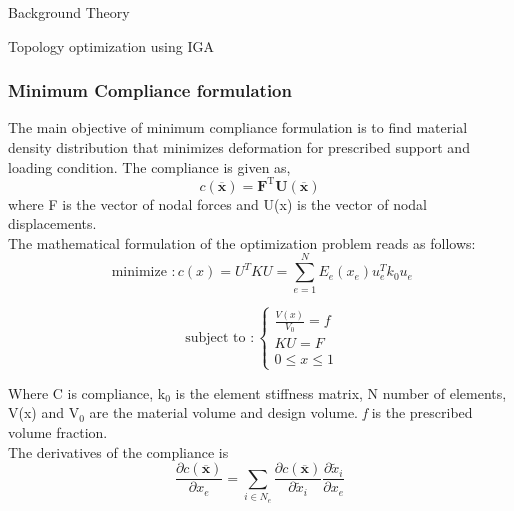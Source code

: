 \documentclass[a4paper,12pt,times]{article}
\begin{document}
\begin{section}{Background Theory}
\begin{subsection}{Topology optimization using IGA}
\subsubsection{Minimum Compliance formulation}

The main objective of minimum compliance formulation is to find material density distribution that minimizes deformation for prescribed support and loading condition.
The compliance is given as,
\begin{equation}
c(\overline{\mathbf{x}})=\mathbf{F}^{\mathrm{T}} \mathbf{U}(\overline{\mathbf{x}})
\end{equation}
where F is the vector of nodal forces and U(x) is the vector
of nodal displacements.\\
The mathematical formulation of the optimization problem reads as follows:
\begin{equation}
\text { minimize }: c(x)=U^{T} K U=\sum_{e=1}^{N} E_{e}\left(x_{e}\right) u_{e}^{T} k_{0} u_{e}
\end{equation}

\begin{equation}
\text { subject to }:\left\{\begin{array}{l}
\frac{V(x)}{V_{0}}=f \\
K U=F \\
0 \leq x \leq 1
\end{array}\right.
\end{equation}

Where C is compliance, k$_0$ is the element stiffness matrix, N number of elements, V(x) and V$_0$ are the material volume and design volume. \textit{f} is the prescribed volume fraction.\\
The derivatives of the compliance is 
\begin{equation}
\frac{\partial c(\overline{\mathbf{x}})}{\partial x_{e}}=\sum_{i \in N_{e}} \frac{\partial c(\overline{\mathbf{x}})}{\partial \tilde{x}_{i}} \frac{\partial \tilde{x}_{i}}{\partial x_{e}}
\end{equation}


\end{subsection}
\end{section}
\end{document}
